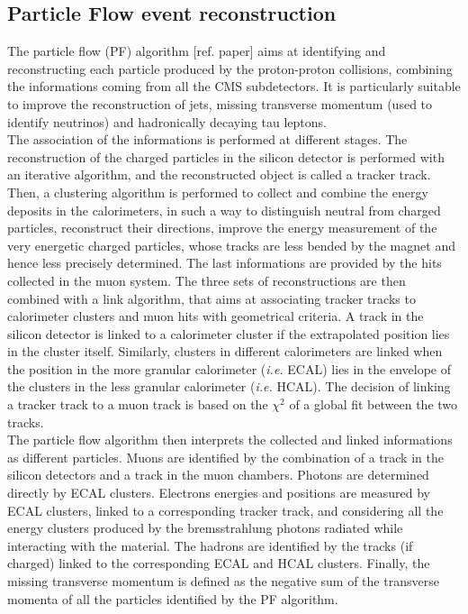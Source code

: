 \subsection{Particle Flow event reconstruction}
The particle flow (PF) algorithm [ref. paper] aims at identifying and reconstructing each particle produced by the proton-proton collisions, combining the informations coming from all the CMS subdetectors. It is particularly suitable to improve the reconstruction of jets, missing transverse momentum (used to identify neutrinos) and hadronically decaying tau leptons.\\
The association of the informations is performed at different stages. The reconstruction of the charged particles in the silicon detector is performed with an iterative algorithm, and the reconstructed object is called a tracker track. Then, a clustering algorithm is performed to collect and combine the energy deposits in the calorimeters, in such a way to distinguish neutral from charged particles, reconstruct their directions, improve the energy measurement of the very energetic charged particles, whose tracks are less bended by the magnet and hence less precisely determined. The last informations are provided by the hits collected in the muon system. The three sets of reconstructions are then combined with a link algorithm, that aims at associating tracker tracks to calorimeter clusters and muon hits with geometrical criteria. A track in the silicon detector is linked to a calorimeter cluster if the extrapolated position lies in the cluster itself. Similarly, clusters in different calorimeters are linked when the position in the more granular calorimeter (\textit{i.e.} ECAL) lies in the envelope of the clusters in the less granular calorimeter (\textit{i.e.} HCAL). The decision of linking a tracker track to a muon track is based on the $\chi^2$ of a global fit between the two tracks.\\
The particle flow algorithm then interprets the collected and linked informations as different particles. Muons are identified by the combination of a track in the silicon detectors and a track in the muon chambers. Photons are determined directly by ECAL clusters. Electrons energies and positions are measured by ECAL clusters, linked to a corresponding tracker track, and considering all the energy clusters produced by the bremsstrahlung photons radiated while interacting with the material. The hadrons are identified by the tracks (if charged) linked to the corresponding ECAL and HCAL clusters. Finally, the missing transverse momentum is defined as the negative sum of the transverse momenta of all the particles identified by the PF algorithm.\\

